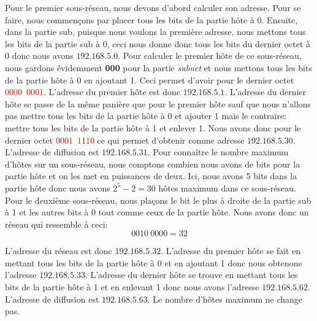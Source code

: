 \documentclass[11pt,a4paper,openany]{book}
\begin{document}
Pour le premier sous-réseau, nous devons d'abord calculer son adresse. Pour se faire, nous commençons par placer tous les bits de la partie hôte à 0. Ensuite, dans la partie sub, puisque nous voulons la première adresse, nous mettons tous les bits de la partie sub à 0, ceci nous donne donc tous les bits du dernier octet à 0 donc nous avons $ 192.168.5.0 $. Pour calculer le premier hôte de ce sous-réseau, nous gardons évidemment \textbf{000} pour la partie \textit{subnet} et nous mettons tous les bits de la partie hôte à 0 en ajoutant 1. Ceci permet d'avoir pour le dernier octet \textcolor{red}{0000~0001}. L'adresse du premier hôte est donc $ 192.168.5.1 $. L'adresse du dernier hôte se passe de la même panière que pour le premier hôte sauf que nous n'allons pas mettre tous les bits de la partie hôte à 0 et ajouter 1 mais le contraire: mettre tous les bits de la partie hôte à 1 et enlever 1. Nous avons donc pour le dernier octet \textcolor{red}{0001~1110} ce qui permet d'obtenir comme adresse $ 192.168.5.30 $. L'adresse de diffusion est $ 192.168.5.31 $. Pour connaître le nombre maximum d'hôtes sur un sous-réseau, nous comptons combien nous avons de bits pour la partie hôte et on les met en puissances de deux. Ici, nous avons 5 bits dans la partie hôte donc nous avons $ 2^{5} - 2 = 30 $ hôtes maximum dans ce sous-réseau.\\

Pour le deuxième sous-réseau, nous plaçons le bit le plus à droite de la partie sub à 1 et les autres bits à 0 tout comme ceux de la partie hôte. Nous avons donc un réseau qui ressemble à ceci:\\
\begin{equation*}
0010~0000 = 32
\end{equation*}

L'adresse du réseau est donc $ 192.168.5.32 $. L'adresse du premier hôte se fait en mettant tous les bits de la partie hôte à 0 et en ajoutant 1 donc nous obtenons l'adresse $ 192.168.5.33 $. L'adresse du dernier hôte se trouve en mettant tous les bits de la partie hôte à 1 et en enlevant 1 donc nous avons l'adresse $ 192.168.5.62 $. L'adresse de diffusion est $ 192.168.5.63 $. Le nombre d'hôtes maximum ne change pas.\\
\end{document}
